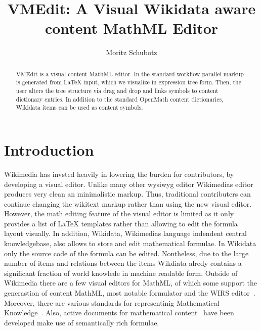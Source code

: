 \documentclass{llncs}
\begin{document}
\title{VMEdit: A Visual Wikidata aware content MathML Editor}

\author{
   Moritz Schubotz
}


\maketitle

\begin{abstract}
VMEdit is a visual content MathML editor.
In the standard workflow parallel markup is generated from LaTeX input, which we visualize in expression tree form.
Then, the user alters the tree structure via drag and drop and links symbols to content dictionary entries.
In addition to the standard OpenMath content dictionaries, Wikidata items can be used as content symbols.
\end{abstract}

\section{Introduction}
Wikimedia has invsted heavily in lowering the burden for contributors, by developing a visual editor.
Unlike many other wysiwyg editor Wikimedias editor produces very clean an minimalistic markup.
Thus, traditional contributers can continue changing the wikitext markup rather than using the new visual editor.
However, the math editing feature of the visual editor is limited as it only provides a list of LaTeX templates rather than allowing to edit the formula layout visually.
In addition, Wikidata, Wikimedias language indendent central knowledgebase, also allows to store and edit mathematical formulae.
In Wikidata only the source code of the formula can be edited.
Nontheless, due to the large number of items and relations between the items Wikdiata alredy contains a significant fraction of world knowlede in machine readable form.
Outside of Wikimedia there are a few visual editors for MathML, of which some support the generastion of content MathML, most notable formulator and the WIRS editor~\cite{Formulator,Marques2006}.
Moreover, there are various standards for representinig Mathematical Knowledge~\cite{Lange2013}.
Also, active documents for mathematical content~\cite{Kohlhase11} have been developed make use of semantically rich formulae.
\end{document}
